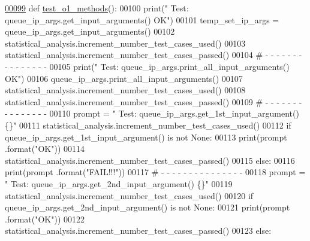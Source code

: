 \begin{DoxyCode}
\hypertarget{classutilities_1_1queue__ip__arguments__tester_1_1queue__ip__args__tester_l00099}{}\hyperlink{classutilities_1_1queue__ip__arguments__tester_1_1queue__ip__args__tester_a49bd049dbf616cc1f604d3c0cbe84c43}{00099}     \textcolor{keyword}{def }\hyperlink{classutilities_1_1queue__ip__arguments__tester_1_1queue__ip__args__tester_a49bd049dbf616cc1f604d3c0cbe84c43}{test\_o1\_methods}():
00100         print(\textcolor{stringliteral}{" Test: queue\_ip\_args.get\_input\_arguments()       OK"})
00101         temp\_set\_ip\_args = queue\_ip\_args.get\_input\_arguments()
00102         statistical\_analysis.increment\_number\_test\_cases\_used()
00103         statistical\_analysis.increment\_number\_test\_cases\_passed()
00104         \textcolor{comment}{#   -   -   -   -   -   -   -   -   -   -   -   -   -   -   -}
00105         print(\textcolor{stringliteral}{" Test: queue\_ip\_args.print\_all\_input\_arguments()     OK"})
00106         queue\_ip\_args.print\_all\_input\_arguments()
00107         statistical\_analysis.increment\_number\_test\_cases\_used()
00108         statistical\_analysis.increment\_number\_test\_cases\_passed()
00109         \textcolor{comment}{#   -   -   -   -   -   -   -   -   -   -   -   -   -   -   -}
00110         prompt = \textcolor{stringliteral}{"  Test: queue\_ip\_args.get\_1st\_input\_argument()        \{\}"}
00111         statistical\_analysis.increment\_number\_test\_cases\_used()
00112         \textcolor{keywordflow}{if} queue\_ip\_args.get\_1st\_input\_argument() \textcolor{keywordflow}{is} \textcolor{keywordflow}{not} \textcolor{keywordtype}{None}:
00113             print(prompt .format(\textcolor{stringliteral}{"OK"}))
00114             statistical\_analysis.increment\_number\_test\_cases\_passed()
00115         \textcolor{keywordflow}{else}:
00116             print(prompt .format(\textcolor{stringliteral}{"FAIL!!!"}))
00117         \textcolor{comment}{#   -   -   -   -   -   -   -   -   -   -   -   -   -   -   -}
00118         prompt = \textcolor{stringliteral}{"  Test: queue\_ip\_args.get\_2nd\_input\_argument()        \{\}"}
00119         statistical\_analysis.increment\_number\_test\_cases\_used()
00120         \textcolor{keywordflow}{if} queue\_ip\_args.get\_2nd\_input\_argument() \textcolor{keywordflow}{is} \textcolor{keywordflow}{not} \textcolor{keywordtype}{None}:
00121             print(prompt .format(\textcolor{stringliteral}{"OK"}))
00122             statistical\_analysis.increment\_number\_test\_cases\_passed()
00123         \textcolor{keywordflow}{else}:

\end{DoxyCode}
